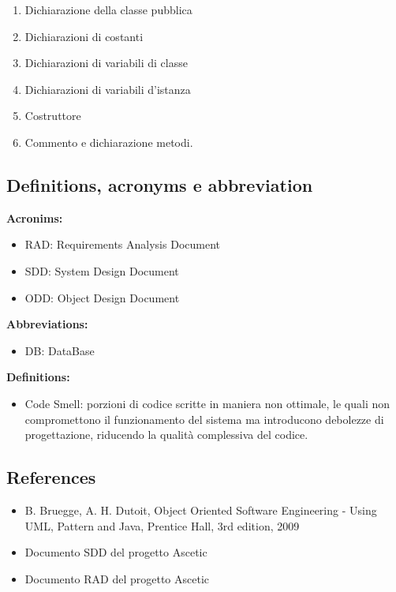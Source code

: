\documentclass[11pt]{article}
\begin{document}
\begin{itemize}
\begin{enumerate}
\begin{itemize}
					\begin{enumerate}
						\item Dichiarazione della classe pubblica
						\item Dichiarazioni di costanti
						\item Dichiarazioni di variabili di classe
						\item Dichiarazioni di variabili d’istanza
						\item Costruttore
						\item Commento e dichiarazione metodi.
					\end{enumerate}
				\end{itemize}
			\end{enumerate}
		\end{itemize}
				
				
		\subsection{Definitions, acronyms e abbreviation}
		
		\textbf{Acronims:}
		\begin{itemize}
			\item RAD: Requirements Analysis Document
			\item SDD: System Design Document
			\item ODD: Object Design Document
		\end{itemize}
		\textbf{Abbreviations:}
		\begin{itemize}
			\item DB: DataBase
		\end{itemize}
		\textbf{Definitions:}
		\begin{itemize}
			\item Code Smell: porzioni di codice scritte in maniera non ottimale, le quali non compromettono il funzionamento del sistema ma introducono debolezze di progettazione, riducendo la qualità complessiva del codice.
		\end{itemize}
			
		
		\subsection{References}
		
			\begin{itemize}
				\item  B. Bruegge, A. H. Dutoit, Object Oriented Software Engineering - Using UML, Pattern and Java,
				Prentice Hall, 3rd edition, 2009
				\item Documento SDD del progetto Ascetic
				\item Documento RAD del progetto Ascetic
			\end{itemize}
\newpage	
\end{document}
